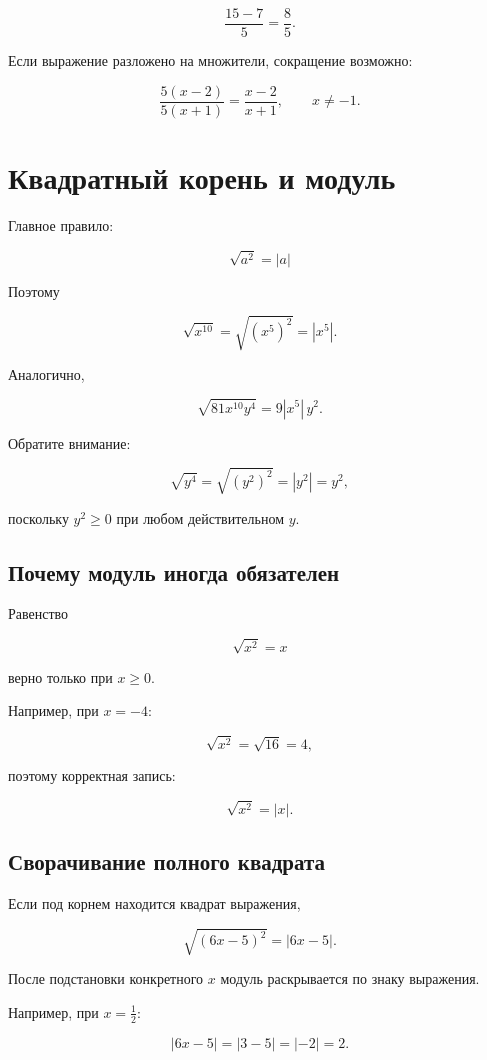 \documentclass[a4paper,12pt]{article}
\begin{document}
\[
\frac{15-7}{5}
=
\frac85.
\]

Если выражение разложено на множители, сокращение возможно:

\[
\frac{5(x-2)}{5(x+1)}
=
\frac{x-2}{x+1},
\qquad x\ne-1.
\]

\section{Квадратный корень и модуль}

Главное правило:

\[
\boxed{\sqrt{a^2}=|a|}
\]

Поэтому

\[
\sqrt{x^{10}}
=
\sqrt{(x^5)^2}
=
|x^5|.
\]

Аналогично,

\[
\sqrt{81x^{10}y^4}
=
9|x^5|\,y^2.
\]

Обратите внимание:

\[
\sqrt{y^4}
=
\sqrt{(y^2)^2}
=
|y^2|
=
y^2,
\]

поскольку \(y^2\ge0\) при любом действительном \(y\).

\subsection{Почему модуль иногда обязателен}

Равенство

\[
\sqrt{x^2}=x
\]

верно только при \(x\ge0\).

Например, при \(x=-4\):

\[
\sqrt{x^2}
=
\sqrt{16}
=
4,
\]

поэтому корректная запись:

\[
\sqrt{x^2}=|x|.
\]

\subsection{Сворачивание полного квадрата}

Если под корнем находится квадрат выражения,

\[
\sqrt{(6x-5)^2}
=
|6x-5|.
\]

После подстановки конкретного \(x\) модуль раскрывается по знаку выражения.

Например, при \(x=\frac12\):

\[
|6x-5|
=
|3-5|
=
|-2|
=
2.
\]
\end{document}
